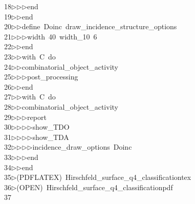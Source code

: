 \begin{tabbing}
18\>$\triangleright$\>$\triangleright$\>$\triangleright$\>end\ \\[0pt]
19\>$\triangleright$\>$\triangleright$\>end\ \\[0pt]
20\>$\triangleright$\>$\triangleright$\>define\ Doinc\ draw\_incidence\_structure\_options\ \\[0pt]
21\>$\triangleright$\>$\triangleright$\>$\triangleright$\>width\ 40\ width\_10\ 6\ \\[0pt]
22\>$\triangleright$\>$\triangleright$\>end\ \\[0pt]
23\>$\triangleright$\>$\triangleright$\>with\ C\ do\ \\[0pt]
24\>$\triangleright$\>$\triangleright$\>combinatorial\_object\_activity\ \\[0pt]
25\>$\triangleright$\>$\triangleright$\>$\triangleright$\>post\_processing\ \\[0pt]
26\>$\triangleright$\>$\triangleright$\>end\ \\[0pt]
27\>$\triangleright$\>$\triangleright$\>with\ C\ do\ \\[0pt]
28\>$\triangleright$\>$\triangleright$\>combinatorial\_object\_activity\ \\[0pt]
29\>$\triangleright$\>$\triangleright$\>$\triangleright$\>report\ \\[0pt]
30\>$\triangleright$\>$\triangleright$\>$\triangleright$\>$\triangleright$\>show\_TDO\ \\[0pt]
31\>$\triangleright$\>$\triangleright$\>$\triangleright$\>$\triangleright$\>show\_TDA\ \\[0pt]
32\>$\triangleright$\>$\triangleright$\>$\triangleright$\>$\triangleright$\>incidence\_draw\_options\ Doinc\ \\[0pt]
33\>$\triangleright$\>$\triangleright$\>$\triangleright$\>end\ \\[0pt]
34\>$\triangleright$\>$\triangleright$\>end\\[0pt]
35\>$\triangleright$\>(PDFLATEX)\ Hirschfeld\_surface\_q4\_classificationtex\\[0pt]
36\>$\triangleright$\>(OPEN)\ Hirschfeld\_surface\_q4\_classificationpdf\\[0pt]
37\>\end{tabbing}
